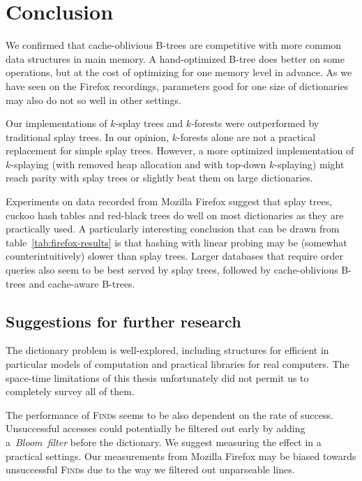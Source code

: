 \chapter*{Conclusion}

We confirmed that cache-oblivious B-trees are competitive with more common
data structures in main memory. A hand-optimized B-tree does better on some
operations, but at the cost of optimizing for one memory level in advance.
As we have seen on the Firefox recordings, parameters good for one size of
dictionaries may also do not so well in other settings.

Our implementations of $k$-splay trees and $k$-forests were outperformed
by traditional splay trees. In our opinion, $k$-forests alone are not
a practical replacement for simple splay trees. However, a more optimized
implementation of $k$-splaying (with removed heap allocation and with top-down
$k$-splaying) might reach parity with splay trees or slightly beat them
on large dictionaries.

Experiments on data recorded from Mozilla Firefox suggest that splay trees,
cuckoo hash tables and red-black trees do well on most dictionaries as they are
practically used. A particularly interesting conclusion that can be drawn from
table~\ref{tab:firefox-results} is that hashing with linear probing may
be (somewhat counterintuitively) slower than splay trees.
Larger databases that require order queries also seem to be best served
by splay trees, followed by cache-oblivious \mbox{B-trees} and cache-aware
\mbox{B-trees}.

\section*{Suggestions for further research}
The dictionary problem is well-explored, including structures for efficient
in particular models of computation and practical libraries for real computers.
The space-time limitations of this thesis unfortunately did not permit us to
completely survey all of them.

The performance of \textsc{Find}s seems to be also dependent on
the rate of success. Unsuccessful accesses could potentially be filtered out
early by adding a~\emph{Bloom~filter} before the dictionary. We suggest
measuring the effect in a practical settings. Our measurements from Mozilla
Firefox may be biased towards unsuccessful \textsc{Find}s due to the way we
filtered out unparseable lines.

